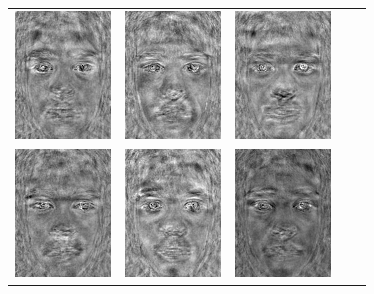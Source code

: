 \documentclass[12pt]{article}
\begin{document}
\begin{enumerate}
\begin{enumerate}
\begin{table}[H]
\begin{tabular}{ccccc}
\includegraphics[width=1in]{lda/12}&\includegraphics[width=1in]{lda/13}&
\includegraphics[width=1in]{lda/14}\\\includegraphics[width=1in]{lda/15}&
\includegraphics[width=1in]{lda/16}&\includegraphics[width=1in]{lda/17}&

\end{tabular}
\end{table}
\end{enumerate}
\end{enumerate}
\end{document}
